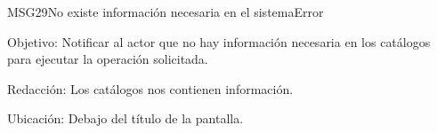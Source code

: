 \begin{mensaje}{MSG29}{No existe información necesaria en el sistema}{Error}
	\item [Objetivo:] Notificar al actor que no hay información necesaria en los catálogos para ejecutar la operación solicitada.
	\item[Redacción:] Los catálogos nos contienen información.
	\item [Ubicación:] Debajo del título de la pantalla.
\end{mensaje}